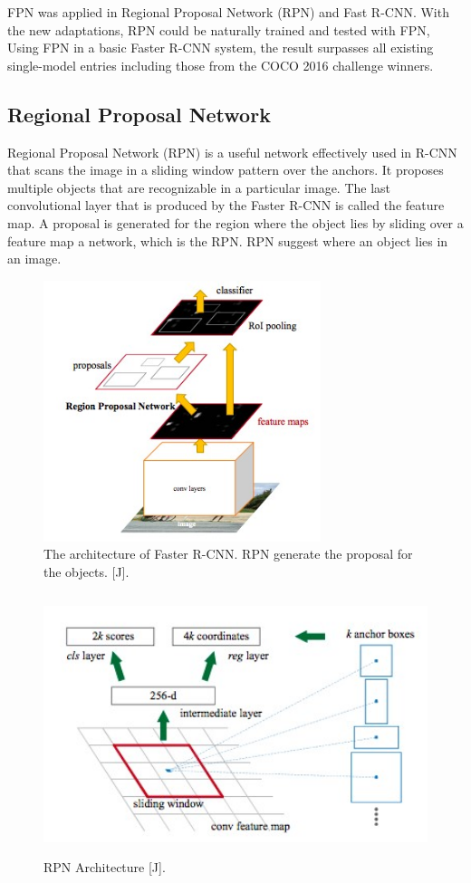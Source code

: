 FPN was applied in Regional Proposal Network (RPN) and Fast R-CNN. With the new adaptations, RPN could be naturally trained and tested with FPN, Using FPN in a basic Faster R-CNN system, the result surpasses all existing single-model entries including those from the COCO 2016 challenge winners.

\subsection{Regional Proposal Network}
Regional Proposal Network (RPN) is a useful network effectively used in R-CNN that scans the image in a sliding window pattern over the anchors.  It proposes multiple objects that are recognizable in a particular image. The last convolutional layer that is produced by the Faster R-CNN is called the feature map. A proposal is generated for the region where the object lies by sliding over a feature map a network, which is the RPN. RPN suggest where an object lies in an image.
\begin{figure}[H]
\centering
  \includegraphics[height=3in]{images/rcnn-rpn.jpg}
   \caption{The architecture of Faster R-CNN. RPN generate the proposal for the objects. [J].}
\end{figure}

\begin{figure}[H]
\centering
  \includegraphics[height=3in]{images/rpn-arch.jpg}
   \caption{RPN Architecture [J].}
\end{figure}

